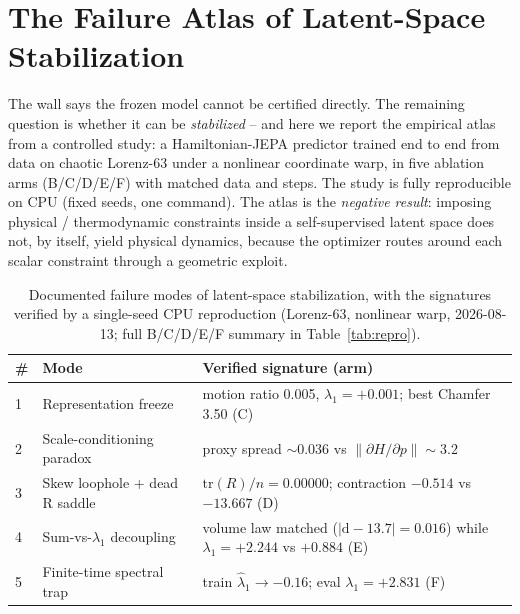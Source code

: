 \documentclass[journal]{IEEEtran}
\begin{document}
\section{The Failure Atlas of Latent-Space Stabilization}
\label{sec:atlas}

The wall says the frozen model cannot be certified directly. The remaining
question is whether it can be \emph{stabilized} -- and here we report the
empirical atlas from a controlled study: a Hamiltonian-JEPA predictor trained
end to end from data on chaotic Lorenz-63 under a nonlinear coordinate warp,
in five ablation arms (B/C/D/E/F) with matched data and steps. The study is
fully reproducible on CPU (fixed seeds, one command). The atlas is the
\emph{negative result}: imposing physical / thermodynamic constraints inside
a self-supervised latent space does not, by itself, yield physical dynamics,
because the optimizer routes around each scalar constraint through a
geometric exploit.

\begin{table}[t]
\caption{Documented failure modes of latent-space stabilization, with the
signatures verified by a single-seed CPU reproduction (Lorenz-63, nonlinear
warp, 2026-08-13; full B/C/D/E/F summary in Table~\ref{tab:repro}).}
\label{tab:atlas}
\centering
\small
\begin{tabular}{@{}lll@{}}
\toprule
\# & Mode & Verified signature (arm) \\
\midrule
1 & Representation freeze &
  motion ratio 0.005, $\lambda_1=+0.001$; best Chamfer 3.50 (C) \\
2 & Scale-conditioning paradox &
  proxy spread $\sim0.036$ vs $\|\partial H/\partial p\| \sim 3.2$ \\
3 & Skew loophole + dead R saddle &
  $\mathrm{tr}(R)/n = 0.00000$; contraction $-0.514$ vs $-13.667$ (D) \\
4 & Sum-vs-$\lambda_1$ decoupling &
  volume law matched ($|\mathrm{d}{-}13.7|=0.016$) while
  $\lambda_1=+2.244$ vs $+0.884$ (E) \\
5 & Finite-time spectral trap &
  train $\hat\lambda_1 \to -0.16$; eval $\lambda_1 = +2.831$ (F) \\
\bottomrule
\end{tabular}
\end{table}
\end{document}
